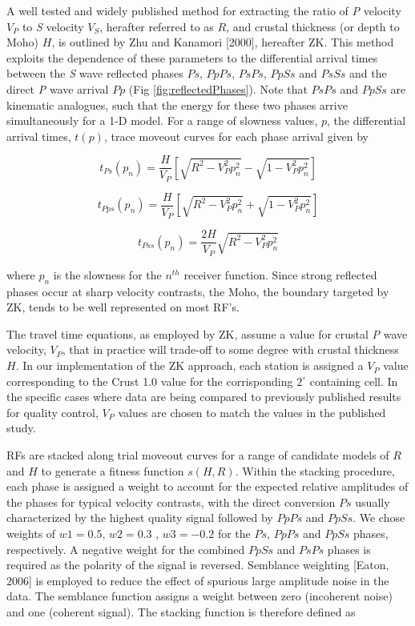 \documentclass[draft, 12pt]{article}
\begin{document}
A well tested and widely published method for extracting the ratio of {\it P} velocity $V_P$ to {\it S} velocity $V_S$, herafter referred to as $R$, and crustal thickness (or depth to Moho) $H$, is outlined by Zhu and Kanamori [2000], hereafter ZK. This method exploits the dependence of these parameters to the differential arrival times between the {\it S} wave reflected phases $Ps$, $PpPs$, $PsPs$, $PpSs$ and $PsSs$ and the direct {\it P} wave arrival $Pp$ (Fig \ref{fig:reflectedPhases}). Note that $PsPs$ and $PpSs$ are kinematic analogues, such that the energy for these two phases arrive simultaneously for a 1-D model. For a range of slowness values, $p$, the differential arrival times, $t(p)$, trace moveout curves for each phase arrival given by

\begin{equation} \label{eq:tps}
t_{Ps}(p_n) = \frac{H}{V_P} \left[ \sqrt{ R^2 - V_P^2p_n^2} - \sqrt{1 - V_P^2p_n^2} \right]
\end{equation}

\begin{equation}
t_{Pps}(p_n) = \frac{H}{V_P} \left[ \sqrt{ R^2 - V_P^2p_n^2} + \sqrt{1 - V_P^2p_n^2} \right]
\end{equation}

\begin{equation}
t_{Pss}(p_n)= \frac{2H}{V_P} \sqrt{ R^2 - V_P^2p_n^2}
\end{equation}

\noindent where $p_n$ is the slowness for the $n^{th}$ receiver function. Since strong reflected phases occur at sharp velocity contrasts, the Moho, the boundary targeted by ZK, tends to be well represented on most RF's.

The travel time equations, as employed by ZK, assume a value for crustal {\it P} wave velocity, $V_P$, that in practice will trade-off to some degree with crustal thickness $H$. In our implementation of the ZK approach, each station is assigned a $V_P$ value corresponding to the Crust 1.0 value for the corrisponding $2^\circ$ containing cell. In the specific cases where data are being compared to previously published results for quality control, $V_P$  values are chosen to match the values in the published study.

RFs are stacked along trial moveout curves for a range of candidate models of $R$ and $H$ to generate a fitness function $s(H,R)$.  Within the stacking procedure, each phase is assigned a weight to account for the expected relative amplitudes of the phases for typical velocity contrasts, with the direct conversion $Ps$ usually characterized by the highest quality signal followed by $PpPs$ and $PpSs$. We chose weights of $w1 = 0.5$, $w2 = 0.3$ , $w3 = -0.2$ for the $Ps$, $PpPs$ and $PpSs$ phases, respectively. A negative weight for the combined $PpSs$ and $PsPs$ phases is required as the polarity of the signal is reversed. Semblance weighting [Eaton, 2006] is employed to reduce the effect of spurious large amplitude noise in the data. The semblance function assigns a weight between zero (incoherent noise) and one (coherent signal). The stacking function is therefore defined as
\end{document}
